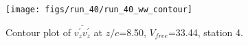 \begin{figure}[H]
\centering
\texttt{[image: figs/run\_40/run\_40\_ww\_contour]}
\caption{Contour plot of $\overline{v_{z}^{\prime} v_{z}^{\prime}}$ at $z/c$=8.50, $V_{free}$=33.44, station 4.}
\label{fig:run_40_ww_contour}
\end{figure}


